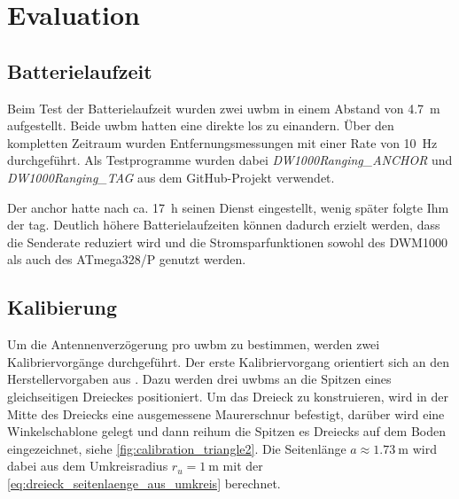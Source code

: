 %
%
%
\chapter{Evaluation}\label{ch:eval}


%
%
\section{Batterielaufzeit}

Beim Test der Batterielaufzeit wurden zwei \gls{uwbm} in einem Abstand von \SI{4.7}{\metre} aufgestellt. Beide \gls{uwbm} hatten eine direkte \gls{los} zu einandern. Über den kompletten Zeitraum wurden Entfernungsmessungen mit einer Rate von \SI{10}{\hertz} durchgeführt. Als Testprogramme wurden dabei \textit{DW1000Ranging\_ANCHOR} und \textit{DW1000Ranging\_TAG} aus dem GitHub-Projekt \cite{Trojer2015} verwendet.

Der \Gls{anchor} hatte nach ca. \SI{17}{\hour} seinen Dienst eingestellt, wenig später folgte Ihm der \Gls{tag}. Deutlich höhere Batterielaufzeiten können dadurch erzielt werden, dass die Senderate reduziert wird und die Stromsparfunktionen sowohl des DWM1000 als auch des ATmega328/P genutzt werden.


%
%
\section{Kalibierung}

Um die Antennenverzögerung pro \Gls{uwbm} zu bestimmen, werden zwei Kalibriervorgänge durchgeführt. Der erste Kalibriervorgang orientiert sich an den Herstellervorgaben aus \cite{decawave2014calibration}. Dazu werden drei \Glspl{uwbm} an die Spitzen eines gleichseitigen Dreieckes positioniert. Um das Dreieck zu konstruieren, wird in der Mitte des Dreiecks eine ausgemessene Maurerschnur befestigt, darüber wird eine Winkelschablone gelegt und dann reihum die Spitzen es Dreiecks auf dem Boden eingezeichnet, siehe \autoref{fig:calibration_triangle2}. Die Seitenlänge $a \approx \SI{1.73}{\meter}$ wird dabei aus dem Umkreisradius $r_u = \SI{1}{\meter}$ mit der \autoref{eq:dreieck_seitenlaenge_aus_umkreis} berechnet.

